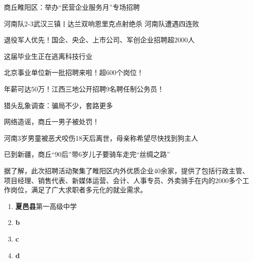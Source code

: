 \documentclass{ctexart}
\newcommand{\litem}[1]{\item{\bfseries\color{blue}#1}}
\begin{document}
\begin{exam}
	
	\item 商丘睢阳区：举办“民营企业服务月”专场招聘
	\item 河南队2-3武汉三镇丨达兰双响恩里克点射绝杀 河南队遭遇四连败
	\begin{exam}
		\item 退役军人优先！国企、央企、上市公司、军创企业招聘超2000人
		\item 这届毕业生正在逃离科技行业
		\begin{exam}
			\item 北京事业单位新一批招聘来啦！超600个岗位！
			\item 年薪可达50万！江西三地公开招聘9名聘任制公务员！
		\end{exam}
		\item 猎头乱象调查：骗局不少，套路更多
	\end{exam}
	\item 网络造谣，商丘一男子被处罚！
	\item 河南3岁男童被恶犬咬伤18天后离世，母亲称希望尽快找到狗主人
	\item 已到新疆，商丘“90后”带6岁儿子要骑车走完“丝绸之路”
\end{exam}

据了解，此次招聘活动聚集了睢阳区内外优质企业40余家，提供了包括行政主管、项目经理、销售代表、新媒体运营、会计、人事专员、外卖骑手在内的2000多个工作岗位，满足了广大求职者多元化的就业需求。


\begin{enumerate}[resume]
	\litem {夏邑县}第一高级中学
	\litem b
	\litem c
	\litem d
\end{enumerate}




	
	
	
	
	
	
	
	
	
	
	
	
	
	
	
\end{document}
